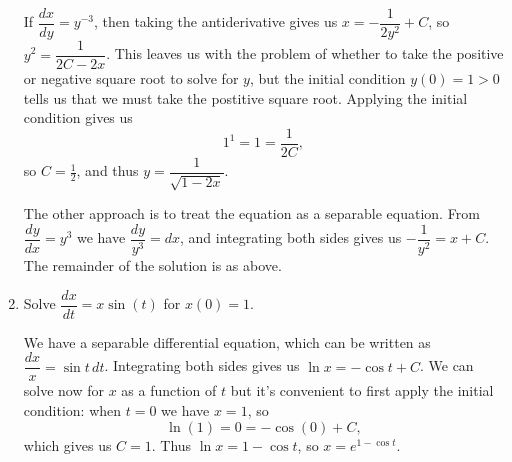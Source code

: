 \documentclass[12pt]{article}
\begin{document}
\begin{enumerate}
If $\dfrac{dx}{dy} = y^{-3}$, then taking the antiderivative gives us $x = -\dfrac{1}{2y^2}+C$, so $y^2=\dfrac{1}{2C-2x}$. This leaves us with the problem of whether to take the positive or negative square root to solve for $y$, but the initial condition $y(0)=1>0$ tells us that we must take the postitive square root. Applying the initial condition gives us
\[
 1^1 = 1 = \frac{1}{2C},
\]
so $C=\frac{1}{2}$, and thus $y=\dfrac{1}{\sqrt{1-2x}}$.

The other approach is to treat the equation as a separable equation. From $\dfrac{dy}{dx}=y^3$ we have $\dfrac{dy}{y^3}=dx$, and integrating both sides gives us $-\dfrac{1}{y^2} = x+C$. The remainder of the solution is as above.
 
 \item Solve $\dfrac{dx}{dt} = x\sin(t)$ for $x(0)=1$.

\bigskip

We have a separable differential equation, which can be written as $\dfrac{dx}{x} = \sin t\,dt$. Integrating both sides gives us $\ln x = -\cos t+C$. We can solve now for $x$ as a function of $t$ but it's convenient to first apply the initial condition: when $t=0$ we have $x=1$, so
\[
 \ln (1) = 0 = -\cos(0)+C,
\]
which gives us $C=1$. Thus $\ln x = 1-\cos t$, so $x = e^{1-\cos t}$.
\end{enumerate}


\end{document}
